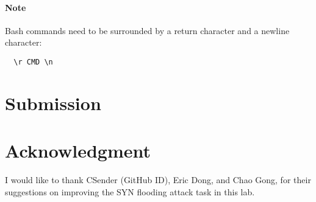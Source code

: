 \paragraph{Note} Bash commands need to be surrounded by a return character and a newline character:

\begin{lstlisting}
  \r CMD \n
\end{lstlisting}



\section{Submission}



\section*{Acknowledgment}

I would like to thank CSender (GitHub ID), Eric Dong, and Chao Gong,
for their suggestions on improving the SYN flooding attack
task in this lab. 




